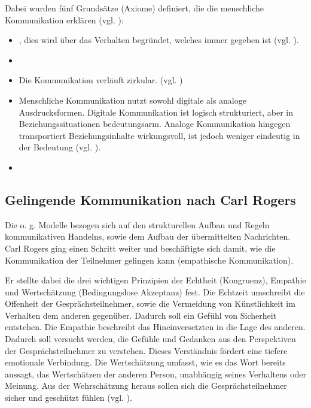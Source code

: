 Dabei wurden fünf Grundsätze (Axiome) definiert, die die menschliche Kommunikation erklären (vgl. \cite{Watzlawick2016-km}):
\begin{itemize}
    \item {}, dies wird über das Verhalten begründet, welches immer gegeben ist (vgl. \cite[S. 53]{Watzlawick2016-km}).
    \item {} \cite[S. 64]{Watzlawick2016-km}
    \item {} Die Kommunikation verläuft zirkular. (vgl. \cite[S. 69]{Watzlawick2016-km})
    \item Menschliche Kommunikation nutzt sowohl digitale als analoge Ausdrucksformen. Digitale Kommunikation ist logisch strukturiert, aber in Beziehungssituationen bedeutungsarm. Analoge Kommunikation hingegen transportiert Beziehungsinhalte wirkungsvoll, ist jedoch weniger eindeutig in der Bedeutung (vgl. \cite[S. 77]{Watzlawick2016-km}).
    \item {} \cite[S. 80]{Watzlawick2016-km}
\end{itemize}

\subsection{Gelingende Kommunikation nach Carl Rogers}
Die o. g. Modelle bezogen sich auf den strukturellen Aufbau und Regeln kommunikativen Handelns, sowie dem Aufbau der übermittelten Nachrichten. Carl Rogers ging einen Schritt weiter und beschäftigte sich damit, wie die Kommunikation der Teilnehmer gelingen kann (empathische Kommunikation). 

Er stellte dabei die drei wichtigen Prinzipien der Echtheit (Kongruenz), Empathie und Wertschätzung (Bedingungslose Akzeptanz) fest. Die Echtzeit umschreibt die Offenheit der Gesprächsteilnehmer, sowie die Vermeidung von Künstlichkeit im Verhalten dem anderen gegenüber. Dadurch soll ein Gefühl von Sicherheit entstehen. Die Empathie beschreibt das Hineinversetzten in die Lage des anderen. Dadurch soll versucht werden, die Gefühle und Gedanken aus den Perspektiven der Gesprächsteilnehmer zu verstehen. Dieses Verständnis fördert eine tiefere emotionale Verbindung. Die Wertschätzung umfasst, wie es das Wort bereits aussagt, das Wertschätzen der anderen Person, unabhängig seines Verhaltens oder Meinung. Aus der Wehrschätzung heraus sollen sich die Gesprächsteilnehmer sicher und geschützt fühlen (vgl. \cite{jesse_carl_2025}).
 
